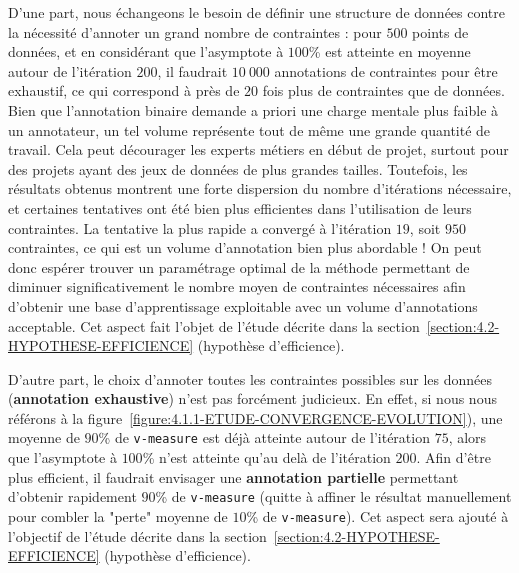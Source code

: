 			D'une part, nous échangeons le besoin de définir une structure de données contre la nécessité d'annoter un grand nombre de contraintes : pour $500$ points de données, et en considérant que l'asymptote à $100$\% est atteinte en moyenne autour de l'itération $200$, il faudrait $10~000$ annotations de contraintes pour être exhaustif, ce qui correspond à près de $20$ fois plus de contraintes que de données.
			Bien que l'annotation binaire demande a priori une charge mentale plus faible à un annotateur, un tel volume représente tout de même une grande quantité de travail.
			Cela peut décourager les experts métiers en début de projet, surtout pour des projets ayant des jeux de données de plus grandes tailles.
			Toutefois, les résultats obtenus montrent une forte dispersion du nombre d'itérations nécessaire, et certaines tentatives ont été bien plus efficientes dans l'utilisation de leurs contraintes. La tentative la plus rapide a convergé à l'itération $19$, soit $950$ contraintes, ce qui est un volume d'annotation bien plus abordable !
			On peut donc espérer trouver un paramétrage optimal de la méthode permettant de diminuer significativement le nombre moyen de contraintes nécessaires afin d'obtenir une base d'apprentissage exploitable avec un volume d'annotations acceptable.
			Cet aspect fait l'objet de l'étude décrite dans la section~\ref{section:4.2-HYPOTHESE-EFFICIENCE} (hypothèse d'efficience).
			
			D'autre part, le choix d'annoter toutes les contraintes possibles sur les données (\textbf{annotation exhaustive}) n'est pas forcément judicieux.
			En effet, si nous nous référons à la figure~\ref{figure:4.1.1-ETUDE-CONVERGENCE-EVOLUTION}), une moyenne de $90$\% de \texttt{v-measure} est déjà atteinte autour de l'itération $75$, alors que l'asymptote à $100$\% n'est atteinte qu'au delà de l'itération $200$. Afin d'être plus efficient, il faudrait envisager une \textbf{annotation partielle} permettant d'obtenir rapidement $90$\% de \texttt{v-measure} (quitte à affiner le résultat manuellement pour combler la "perte" moyenne de $10$\% de \texttt{v-measure}).
			Cet aspect sera ajouté à l'objectif de l'étude décrite dans la section~\ref{section:4.2-HYPOTHESE-EFFICIENCE} (hypothèse d'efficience).
			
